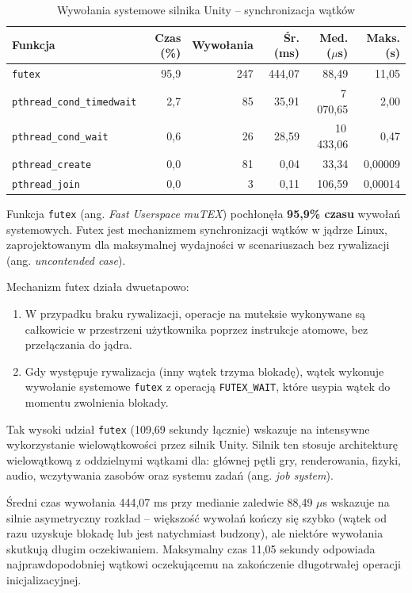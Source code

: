 \begin{table}[H]
\centering
\caption{Wywołania systemowe silnika Unity -- synchronizacja wątków}
\label{tab:unity-osrt-sync}
\small
\begin{tabular}{|l|r|r|r|r|r|}
\hline
\textbf{Funkcja} & \textbf{Czas (\%)} & \textbf{Wywołania} & \textbf{Śr. (ms)} & \textbf{Med. ($\mu$s)} & \textbf{Maks. (s)} \\
\hline
\texttt{futex} & 95,9 & 247 & 444,07 & 88,49 & 11,05 \\
\texttt{pthread\_cond\_timedwait} & 2,7 & 85 & 35,91 & 7\,070,65 & 2,00 \\
\texttt{pthread\_cond\_wait} & 0,6 & 26 & 28,59 & 10\,433,06 & 0,47 \\
\texttt{pthread\_create} & 0,0 & 81 & 0,04 & 33,34 & 0,00009 \\
\texttt{pthread\_join} & 0,0 & 3 & 0,11 & 106,59 & 0,00014 \\
\hline
\end{tabular}
\end{table}


Funkcja \texttt{futex} (ang. \textit{Fast Userspace muTEX}) pochłonęła \textbf{95,9\% czasu} wywołań systemowych. Futex jest mechanizmem 
synchronizacji wątków w jądrze Linux, zaprojektowanym dla maksymalnej wydajności w scenariuszach bez rywalizacji (ang. \textit{uncontended case}).

Mechanizm futex działa dwuetapowo:
\begin{enumerate}
    \item W przypadku braku rywalizacji, operacje na muteksie wykonywane są całkowicie w przestrzeni użytkownika poprzez instrukcje atomowe, bez 
    przełączania do jądra.
    \item Gdy występuje rywalizacja (inny wątek trzyma blokadę), wątek wykonuje wywołanie systemowe \texttt{futex} z operacją \texttt{FUTEX\_WAIT}, 
    które usypia wątek do momentu zwolnienia blokady.
\end{enumerate}

Tak wysoki udział \texttt{futex} (109,69 sekundy łącznie) wskazuje na intensywne wykorzystanie wielowątkowości przez silnik Unity. Silnik ten stosuje 
architekturę wielowątkową z oddzielnymi wątkami dla: głównej pętli gry, renderowania, fizyki, audio, wczytywania zasobów oraz systemu zadań 
(ang. \textit{job system}).

Średni czas wywołania 444,07 ms przy medianie zaledwie 88,49 $\mu$s wskazuje na silnie asymetryczny rozkład -- większość wywołań kończy się szybko 
(wątek od razu uzyskuje blokadę lub jest natychmiast budzony), ale niektóre wywołania skutkują długim oczekiwaniem. Maksymalny czas 11,05 sekundy 
odpowiada najprawdopodobniej wątkowi oczekującemu na zakończenie długotrwałej operacji inicjalizacyjnej.


